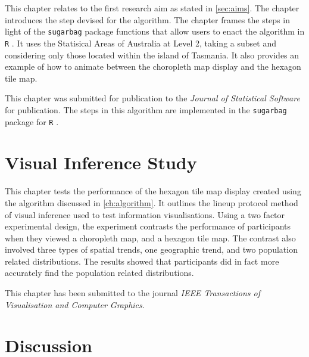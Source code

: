 \documentclass{monashthesis}
\begin{document}
This chapter relates to the first research aim as stated in \ref{sec:aims}.
The chapter introduces the step devised for the algorithm.
The chapter frames the steps in light of the \texttt{sugarbag} \autocite{sugarbag} package functions that allow users to enact the algorithm in \texttt{R} \autocite{R}. It uses the Statisical Areas of Australia at Level 2, taking a subset and considering only those located within the island of Tasmania.
It also provides an example of how to animate between the choropleth map display and the hexagon tile map.

This chapter was submitted for publication to the \emph{Journal of Statistical Software} for publication.
The steps in this algorithm are implemented in the \texttt{sugarbag} \autocite{sugarbag} package for \texttt{R} \autocite{R}.





\hypertarget{ch:experiment}{%
\chapter{Visual Inference Study}\label{ch:experiment}}

This chapter tests the performance of the hexagon tile map display created using the algorithm discussed in \ref{ch:algorithm}.
It outlines the lineup protocol method of visual inference used to test information visualisations.
Using a two factor experimental design, the experiment contrasts the performance of participants when they viewed a choropleth map, and a hexagon tile map.
The contrast also involved three types of spatial trends, one geographic trend, and two population related distributions.
The results showed that participants did in fact more accurately find the population related distributions.

This chapter has been submitted to the journal \emph{IEEE Transactions of Visualisation and Computer Graphics}.





\hypertarget{ch:discussion}{%
\chapter{Discussion}\label{ch:discussion}}
\end{document}
